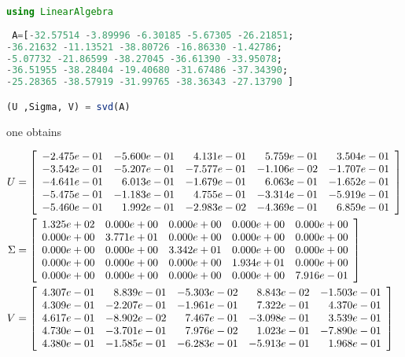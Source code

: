  \begin{lstlisting}[language=Julia]
 using LinearAlgebra
 
 A=[-32.57514 -3.89996 -6.30185 -5.67305 -26.21851;
-36.21632 -11.13521 -38.80726 -16.86330 -1.42786;
-5.07732 -21.86599 -38.27045 -36.61390 -33.95078;
-36.51955 -38.28404 -19.40680 -31.67486 -37.34390;
-25.28365 -38.57919 -31.99765 -38.36343 -27.13790 ]

(U ,Sigma, V) = svd(A)
\end{lstlisting}
one obtains
 
 \begin{align*}
     U&=\left[
\begin{array}{rrrrr}
-2.475e-01 & -5.600e-01 & 4.131e-01 & 5.759e-01 & 3.504e-01 \\
-3.542e-01 & -5.207e-01 & -7.577e-01 & -1.106e-02 & -1.707e-01 \\
-4.641e-01 & 6.013e-01 & -1.679e-01 & 6.063e-01 & -1.652e-01 \\
-5.475e-01 & -1.183e-01 & 4.755e-01 & -3.314e-01 & -5.919e-01 \\
-5.460e-01 & 1.992e-01 & -2.983e-02 & -4.369e-01 & 6.859e-01 \\
\end{array}
\right] \bigskip\\
\Sigma&=\left[
\begin{array}{rrrrr}
1.325e+02 & 0.000e+00 & 0.000e+00 & 0.000e+00 & 0.000e+00 \\
0.000e+00 & 3.771e+01 & 0.000e+00 & 0.000e+00 & 0.000e+00 \\
0.000e+00 & 0.000e+00 & 3.342e+01 & 0.000e+00 & 0.000e+00 \\
0.000e+00 & 0.000e+00 & 0.000e+00 & 1.934e+01 & 0.000e+00 \\
0.000e+00 & 0.000e+00 & 0.000e+00 & 0.000e+00 & 7.916e-01 \\
\end{array}
\right] \bigskip\\
V&=\left[
\begin{array}{rrrrr}
4.307e-01 & 8.839e-01 & -5.303e-02 & 8.843e-02 & -1.503e-01 \\
4.309e-01 & -2.207e-01 & -1.961e-01 & 7.322e-01 & 4.370e-01 \\
4.617e-01 & -8.902e-02 & 7.467e-01 & -3.098e-01 & 3.539e-01 \\
4.730e-01 & -3.701e-01 & 7.976e-02 & 1.023e-01 & -7.890e-01 \\
4.380e-01 & -1.585e-01 & -6.283e-01 & -5.913e-01 & 1.968e-01 \\
\end{array}
\right]
 \end{align*}

